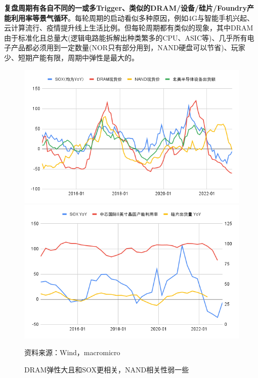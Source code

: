 \documentclass[a4paper,12pt]{ctexart}
\begin{document}
\textbf{复盘周期有各自不同的一或多Trigger、类似的DRAM/设备/硅片/Foundry产能利用率等景气循环}。每轮周期的启动看似多种原因，例如4G与智能手机兴起、云计算流行、疫情提升线上生活比例。但每轮周期都有类似的现象，其中DRAM由于标准化且总量大(逻辑电路能拆解出种类繁多的CPU、ASIC等)、几乎所有电子产品都必须用到一定数量(NOR只有部分用到，NAND硬盘可以节省)、玩家少、短期产能有限，周期中弹性是最大的。
\begin{figure}[H]
    \caption{DRAM弹性大且和SOX更相关，NAND相关性弱一些}
    \begin{minipage}{0.48\linewidth}
        \centering
        \includegraphics[width=\linewidth]{img/monthly.png}
    \end{minipage}
    \begin{minipage}{0.48\linewidth}
        \centering
        \includegraphics[width=\linewidth]{img/quarterly.png}
    \end{minipage}\par
    \footnotesize{资料来源：Wind，macromicro}
\end{figure}
\end{document}
